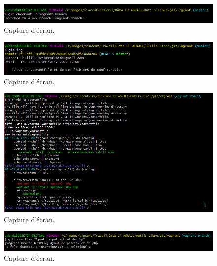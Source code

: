 \documentclass{article}
\begin{document}
\subsection{}

\begin{figure}[h]
\centering
\includegraphics[width=\textwidth]{images/q3-2-1.png}
\caption{\label{fig:frog}Capture d'écran.}
\end{figure}

\begin{figure}[h]
\centering
\includegraphics[width=\textwidth]{images/q3-2-2.png}
\caption{\label{fig:frog}Capture d'écran.}
\end{figure}

\begin{figure}[h]
\centering
\includegraphics[width=\textwidth]{images/q3-2-3.png}
\caption{\label{fig:frog}Capture d'écran.}
\end{figure}

\begin{figure}[h]
\centering
\includegraphics[width=\textwidth]{images/q3-2-4.png}
\caption{\label{fig:frog}Capture d'écran.}
\end{figure}
\end{document}
